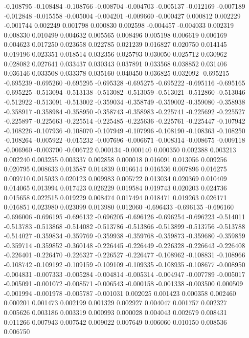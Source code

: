 -0.108795
-0.108484
-0.108766
-0.008704
-0.004703
-0.005137
-0.012169
-0.007189
-0.012848
-0.015558
-0.005004
-0.004201
-0.009660
-0.000427
0.000812
0.002229
-0.001744
0.002249
0.001798
0.000830
0.002598
-0.004457
-0.004033
0.002319
0.008330
0.010499
0.004632
0.005565
0.008496
0.005198
0.006619
0.006169
0.004623
0.017250
0.023658
0.022785
0.021239
0.016827
0.020750
0.014145
0.019196
0.023351
0.018514
0.032356
0.025793
0.030050
0.025712
0.030962
0.028082
0.027641
0.033437
0.030343
0.037891
0.033568
0.038852
0.031406
0.036146
0.033508
0.033378
0.035160
0.040450
0.036825
0.032092
-0.695215
-0.695239
-0.695260
-0.695295
-0.695328
-0.695275
-0.695222
-0.695116
-0.695165
-0.695225
-0.513094
-0.513138
-0.513082
-0.513059
-0.513021
-0.512860
-0.513046
-0.512922
-0.513091
-0.513002
-0.359034
-0.358749
-0.359002
-0.359080
-0.358938
-0.358917
-0.358984
-0.358950
-0.358743
-0.358983
-0.225741
-0.225692
-0.225527
-0.225897
-0.225663
-0.225514
-0.225485
-0.225636
-0.225761
-0.225447
-0.107942
-0.108226
-0.107936
-0.108070
-0.107949
-0.107996
-0.108190
-0.108363
-0.108250
-0.108264
-0.005922
-0.015232
-0.007696
-0.006671
-0.008314
-0.008675
-0.009118
-0.006960
-0.003700
-0.006722
0.000134
-0.000140
0.000350
0.002388
0.003213
0.002240
0.003255
0.003337
0.002858
0.000018
0.016091
0.013056
0.009256
0.020795
0.008633
0.013587
0.014839
0.016614
0.016536
0.007896
0.016275
0.009710
0.015033
0.020123
0.009983
0.005722
0.013034
0.020369
0.010409
0.014065
0.013994
0.017423
0.026229
0.019584
0.019743
0.020203
0.024736
0.015658
0.022515
0.019229
0.008474
0.017494
0.018471
0.019263
0.026171
0.016851
0.023980
0.023099
0.013980
0.012060
-0.696433
-0.696135
-0.696160
-0.696006
-0.696195
-0.696132
-0.696205
-0.696126
-0.696254
-0.696223
-0.514011
-0.513783
-0.513868
-0.514082
-0.513786
-0.513866
-0.513899
-0.513756
-0.513788
-0.514027
-0.359834
-0.359769
-0.359938
-0.359768
-0.359873
-0.359680
-0.359859
-0.359714
-0.359852
-0.360148
-0.226445
-0.226449
-0.226328
-0.226643
-0.226408
-0.226401
-0.226470
-0.226327
-0.226527
-0.226477
-0.108962
-0.108831
-0.108966
-0.108742
-0.109192
-0.109159
-0.109109
-0.109335
-0.108935
-0.108677
-0.008950
-0.004831
-0.007333
-0.005284
-0.004814
-0.005314
-0.004947
-0.007789
-0.005017
-0.005091
-0.001072
-0.008571
-0.006543
-0.000158
-0.001338
-0.003500
0.000509
-0.001994
-0.001978
-0.005787
-0.001031
0.002025
0.001423
0.000358
0.002460
0.000201
0.001473
0.002199
0.001329
0.002927
0.004047
0.001757
0.002327
0.005626
0.003186
0.003319
0.000993
0.000028
0.004043
0.002679
0.008431
0.011266
0.007943
0.007542
0.009022
0.007649
0.006060
0.010150
0.008536
0.006750
